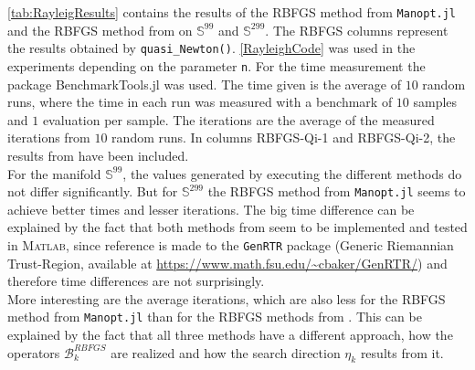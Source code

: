 \cref{tab:RayleigResults} contains the results of the RBFGS method from \lstinline!Manopt.jl! and the RBFGS method from \cite{Qi:2011} on $\mathbb{S}^{99}$ and $\mathbb{S}^{299}$. The RBFGS columns represent the results obtained by \lstinline!quasi_Newton()!. \cref{RayleighCode} was used in the experiments depending on the parameter \lstinline!n!. For the time measurement the package BenchmarkTools.jl was used. The time given is the average of $10$ random runs, where the time in each run was measured with a benchmark of $10$ samples and $1$ evaluation per sample. The iterations are the average of the measured iterations from $10$ random runs. In columns RBFGS-Qi-1 and RBFGS-Qi-2, the results from \cite[Table~5.1]{Qi:2011} have been included. \\
For the manifold $\mathbb{S}^{99}$, the values generated by executing the different methods do not differ significantly. But for $\mathbb{S}^{299}$ the RBFGS method from \lstinline!Manopt.jl! seems to achieve better times and lesser iterations. The big time difference can be explained by the fact that both methods from \cite{Qi:2011} seem to be implemented and tested in \textsc{Matlab}, since reference is made to the \lstinline!GenRTR! package (Generic Riemannian Trust-Region, available at \url{https://www.math.fsu.edu/~cbaker/GenRTR/}) and therefore time differences are not surprisingly. \\
More interesting are the average iterations, which are also less for the RBFGS method from \lstinline!Manopt.jl! than for the RBFGS methods from \cite{Qi:2011}. This can be explained by the fact that all three methods have a different approach, how the operators $\mathcal{B}^{RBFGS}_k$ are realized and how the search direction $\eta_k$ results from it. \\
